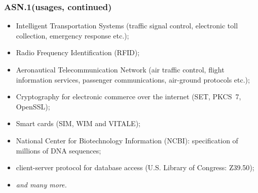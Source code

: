 \documentclass[compress,dvips,xcolor={dvipsnames},t]{beamer}
\newcommand\ASN{\textsf{ASN.1}\xspace}
\begin{document}

\begin{frame}
\frametitle{\ASN (usages, continued)}

\begin{itemize}

  \item Intelligent Transportation Systems (traffic signal
  control, electronic toll collection, emergency response etc.);

  \item Radio Frequency Identification (RFID);

  \item Aeronautical Telecommunication Network (air traffic control,
    flight information services, passenger communications, air-ground
    protocols etc.);

  \item Cryptography for electronic commerce over the internet (SET,
    PKCS~7, OpenSSL);

  \item Smart cards (SIM, WIM and VITALE);

  \item National Center for Biotechnology Information (NCBI):
    specification of millions of DNA sequences;

  \item client-server protocol for database access (U.S. Library of
    Congress: \textsf{Z39.50});

  \item \emph{and many more.}

\end{itemize}

\end{frame}

\end{document}
